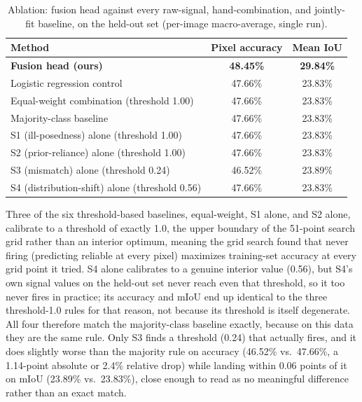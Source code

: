 \documentclass[review]{elsarticle}
\begin{document}
\begin{table}[h]
\centering
\caption{Ablation: fusion head against every raw-signal, hand-combination, and jointly-fit baseline, on the held-out set (per-image macro-average, single run).}
\label{tab:ablation}
\begin{tabular}{lcc}
\toprule
Method & Pixel accuracy & Mean IoU \\
\midrule
\textbf{Fusion head (ours)} & \textbf{48.45\%} & \textbf{29.84\%} \\
Logistic regression control & 47.66\% & 23.83\% \\
Equal-weight combination (threshold 1.00) & 47.66\% & 23.83\% \\
Majority-class baseline & 47.66\% & 23.83\% \\
S1 (ill-posedness) alone (threshold 1.00) & 47.66\% & 23.83\% \\
S2 (prior-reliance) alone (threshold 1.00) & 47.66\% & 23.83\% \\
S3 (mismatch) alone (threshold 0.24) & 46.52\% & 23.89\% \\
S4 (distribution-shift) alone (threshold 0.56) & 47.66\% & 23.83\% \\
\bottomrule
\end{tabular}
\end{table}

Three of the six threshold-based baselines, equal-weight, S1 alone, and S2 alone, calibrate to a threshold of exactly 1.0, the upper boundary of the 51-point search grid rather than an interior optimum, meaning the grid search found that never firing (predicting reliable at every pixel) maximizes training-set accuracy at every grid point it tried. S4 alone calibrates to a genuine interior value (0.56), but S4's own signal values on the held-out set never reach even that threshold, so it too never fires in practice; its accuracy and mIoU end up identical to the three threshold-1.0 rules for that reason, not because its threshold is itself degenerate. All four therefore match the majority-class baseline exactly, because on this data they are the same rule. Only S3 finds a threshold (0.24) that actually fires, and it does slightly worse than the majority rule on accuracy (46.52\% vs.\ 47.66\%, a 1.14-point absolute or 2.4\% relative drop) while landing within 0.06 points of it on mIoU (23.89\% vs.\ 23.83\%), close enough to read as no meaningful difference rather than an exact match.
\end{document}
